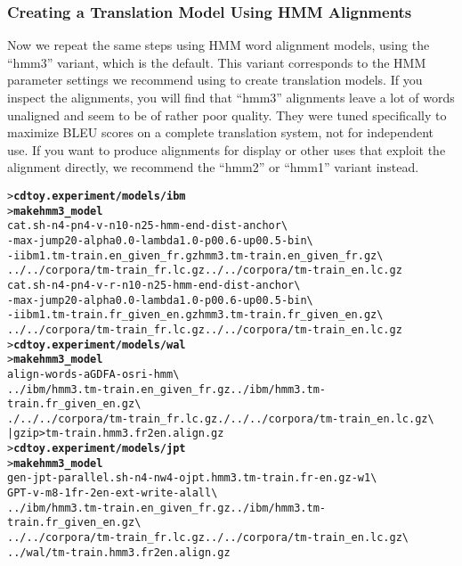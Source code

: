 \documentclass[11pt,letterpaper]{article}
\newcommand{\bs}{\textbackslash{}}
\begin{document}
\subsubsection{Creating a Translation Model Using HMM Alignments} \label{HMM}

Now we repeat the same steps using HMM word alignment models, using the
``hmm3'' variant, which is the default.  This variant corresponds to the HMM
parameter settings we recommend using to create translation models.  If you
inspect the alignments, you will find that ``hmm3'' alignments leave a lot of
words unaligned and seem to be of rather poor quality.  They were tuned
specifically to maximize BLEU scores on a complete translation system, not for
independent use.  If you want to produce alignments for display or other uses
that exploit the alignment directly, we recommend the ``hmm2'' or ``hmm1''
variant instead.

\begin{small}
\begin{alltt}
   > \textbf{cd toy.experiment/models/ibm}
   > \textbf{make hmm3_model}
   cat.sh -n 4 -pn 4 -v -n1 0 -n2 5 -hmm -end-dist -anchor \bs
      -max-jump 20 -alpha 0.0 -lambda 1.0 -p0 0.6 -up0 0.5 -bin \bs
      -i ibm1.tm-train.en_given_fr.gz hmm3.tm-train.en_given_fr.gz \bs
      ../../corpora/tm-train_fr.lc.gz ../../corpora/tm-train_en.lc.gz
   cat.sh -n 4 -pn 4 -v -r -n1 0 -n2 5 -hmm -end-dist -anchor \bs
      -max-jump 20 -alpha 0.0 -lambda 1.0 -p0 0.6 -up0 0.5 -bin \bs
      -i ibm1.tm-train.fr_given_en.gz hmm3.tm-train.fr_given_en.gz \bs
      ../../corpora/tm-train_fr.lc.gz ../../corpora/tm-train_en.lc.gz
   > \textbf{cd toy.experiment/models/wal}
   > \textbf{make hmm3_model}
   align-words -a GDFA -o sri -hmm \bs
      ../ibm/hmm3.tm-train.en_given_fr.gz ../ibm/hmm3.tm-train.fr_given_en.gz \bs
      ./../../corpora/tm-train_fr.lc.gz ./../../corpora/tm-train_en.lc.gz \bs
      | gzip > tm-train.hmm3.fr2en.align.gz
   > \textbf{cd toy.experiment/models/jpt}
   > \textbf{make hmm3_model}
   gen-jpt-parallel.sh -n 4 -nw 4 -o jpt.hmm3.tm-train.fr-en.gz -w 1 \bs
      GPT -v -m 8 -1 fr -2 en -ext -write-al all \bs
      ../ibm/hmm3.tm-train.en_given_fr.gz ../ibm/hmm3.tm-train.fr_given_en.gz \bs
      ../../corpora/tm-train_fr.lc.gz ../../corpora/tm-train_en.lc.gz \bs
      ../wal/tm-train.hmm3.fr2en.align.gz
\end{alltt}
\end{small}
\end{document}
